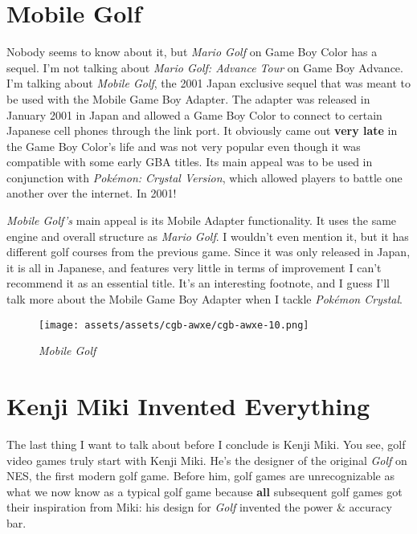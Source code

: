 \documentclass{book}
\begin{document}
\FloatBarrier\needspace{5pt}\section*{Mobile Golf}\nopagebreak[4]

Nobody seems to know about it, but \emph{Mario Golf} on Game Boy Color has a sequel. I’m not talking about \emph{Mario Golf: Advance Tour} on Game Boy Advance. I’m talking about \emph{Mobile Golf}, the 2001 Japan exclusive sequel that was meant to be used with the Mobile Game Boy Adapter. The adapter was released in January 2001 in Japan and allowed a Game Boy Color to connect to certain Japanese cell phones through the link port. It obviously came out \textbf{very late} in the Game Boy Color’s life and was not very popular even though it was compatible with some early GBA titles. Its main appeal was to be used in conjunction with \emph{Pokémon: Crystal Version}, which allowed players to battle one another over the internet. In 2001!

\emph{Mobile Golf’s} main appeal is its Mobile Adapter functionality. It uses the same engine and overall structure as \emph{Mario Golf}. I wouldn’t even mention it, but it has different golf courses from the previous game. Since it was only released in Japan, it is all in Japanese, and features very little in terms of improvement I can’t recommend it as an essential title. It’s an interesting footnote, and I guess I’ll talk more about the Mobile Game Boy Adapter when I tackle \emph{Pokémon Crystal}.

\begin{figure}[hbt]
\vskip 10pt
\centering \texttt{[image: assets/assets/cgb-awxe/cgb-awxe-10.png]}\par\pagetwodescription \emph{Mobile Golf}
\vskip 6pt
\end{figure}

\FloatBarrier\needspace{5pt}\section*{Kenji Miki Invented Everything}\nopagebreak[4]

The last thing I want to talk about before I conclude is Kenji Miki. You see, golf video games truly start with Kenji Miki. He’s the designer of the original \emph{Golf} on NES, the first modern golf game. Before him, golf games are unrecognizable as what we now know as a typical golf game because \textbf{all} subsequent golf games got their inspiration from Miki: his design for \emph{Golf} invented the power \& accuracy bar.
\end{document}
